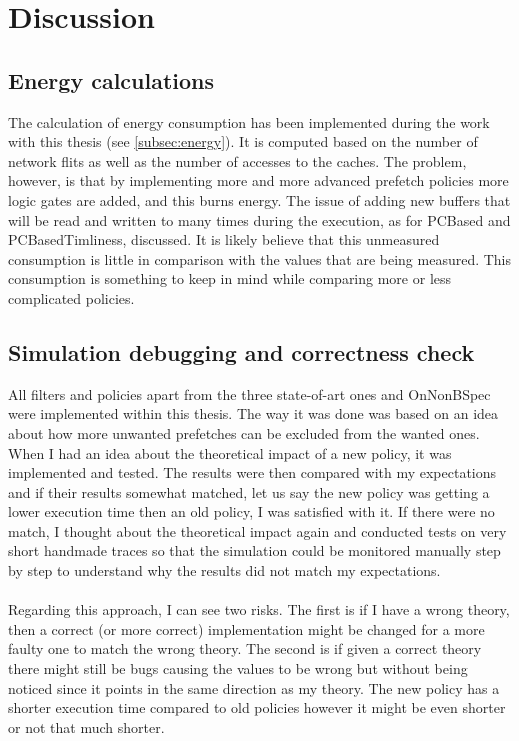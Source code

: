 \chapter{Discussion}
\label{chap:discussion}

\section{Energy calculations }
 The calculation of energy consumption has been implemented during the work with this thesis (see \ref{subsec:energy}). It is computed based on the number of network flits as well as the
number of accesses to the caches. The problem, however, is that by implementing
more and more advanced prefetch policies more logic gates are added, and this burns
energy. The issue of adding new buffers that will be read and written
to many times during the execution, as for PCBased and PCBasedTimliness,
 discussed. It is likely believe that this unmeasured consumption is little in comparison with the values that are being measured. This consumption is something to
keep in mind while comparing more or less complicated policies.

\section{Simulation debugging and correctness check }
All filters and policies apart from the three state-of-art ones and OnNonBSpec were
implemented within this thesis. The way it was done was based on an idea about
how more unwanted prefetches can be excluded from the wanted ones. When I had an idea about the theoretical impact of a new policy, it was implemented and tested. The results were then compared with my expectations and if their results somewhat matched, let us say the new policy was getting a lower execution time then an old policy, I was satisfied with it. If there were no match, I thought about the theoretical
impact again and conducted tests on very short handmade traces so that the simulation could be monitored manually step by step to understand why the results did
not match my expectations.
 \\ \\
Regarding this approach, I can see two risks. The first is if I have a wrong theory, then a correct (or more correct) implementation might be changed for a more faulty one to match the wrong theory. The second is if given a correct theory there might still be bugs causing the values to be wrong but without being noticed since it points in the same direction as my theory. The new policy has a shorter execution time compared to old policies however it might be even shorter or not that much shorter.
